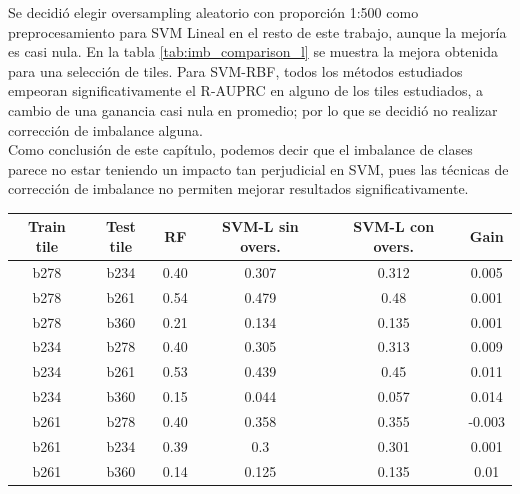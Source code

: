 Se decidió elegir oversampling aleatorio con proporción 1:500 como preprocesamiento para SVM Lineal en el resto de este trabajo, aunque la mejoría es casi nula. En la tabla \ref{tab:imb_comparison_l} se muestra la mejora obtenida para una selección de tiles. Para SVM-RBF, todos los métodos estudiados empeoran significativamente el R-AUPRC en alguno de los tiles estudiados, a cambio de una ganancia casi nula en promedio; por lo que se decidió no realizar corrección de imbalance alguna. \\

Como conclusión de este capítulo, podemos decir que el imbalance de clases parece no estar teniendo un impacto tan perjudicial en SVM, pues las técnicas de corrección de imbalance no permiten mejorar resultados significativamente.

\begin{table}[ht]
\centering
\begin{tabular}{|c|c|c|c|c|c|}
\hline
\textbf{Train tile} & \textbf{Test tile} & \textbf{RF} & \textbf{SVM-L sin overs.} & \textbf{SVM-L con overs.} & \textbf{Gain} \\ \hline
b278                & b234               & 0.40        & 0.307                     & 0.312                     & 0.005         \\ \hline
b278                & b261               & 0.54        & 0.479                     & 0.48                      & 0.001         \\ \hline
b278                & b360               & 0.21        & 0.134                     & 0.135                     & 0.001         \\ \hline
b234                & b278               & 0.40        & 0.305                     & 0.313                     & 0.009         \\ \hline
b234                & b261               & 0.53        & 0.439                     & 0.45                      & 0.011         \\ \hline
b234                & b360               & 0.15        & 0.044                     & 0.057                     & 0.014         \\ \hline
b261                & b278               & 0.40        & 0.358                     & 0.355                     & -0.003        \\ \hline
b261                & b234               & 0.39        & 0.3                       & 0.301                     & 0.001         \\ \hline
b261                & b360               & 0.14        & 0.125                     & 0.135                     & 0.01          \\ \hline

\end{tabular}
\end{table}
